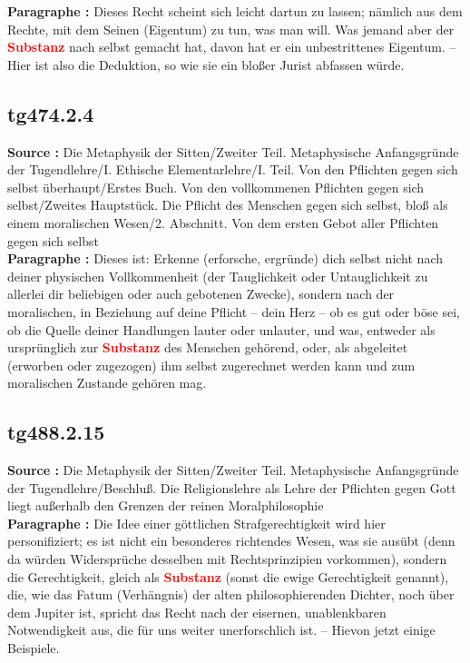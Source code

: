 \documentclass[a4paper,12pt,twoside]{book}
\newcommand{\match}[1]{\textcolor{red}{\textbf{#1}}}
\begin{document}
	\textbf{Paragraphe : }Dieses Recht scheint sich leicht dartun zu lassen; nämlich aus dem Rechte, mit dem Seinen (Eigentum) zu tun, was man will. Was jemand aber der \match{Substanz} nach selbst gemacht hat, davon hat er ein unbestrittenes Eigentum. – Hier ist also die Deduktion, so wie sie ein bloßer Jurist abfassen würde. 
	
	\subsection*{tg474.2.4} 
	\textbf{Source : }Die Metaphysik der Sitten/Zweiter Teil. Metaphysische Anfangsgründe der Tugendlehre/I. Ethische Elementarlehre/I. Teil. Von den Pflichten gegen sich selbst überhaupt/Erstes Buch. Von den vollkommenen Pflichten gegen sich selbst/Zweites Hauptstück. Die Pflicht des Menschen gegen sich selbst, bloß als einem moralischen Wesen/2. Abschnitt. Von dem ersten Gebot aller Pflichten gegen sich selbst\\  
	
	\textbf{Paragraphe : }Dieses ist: Erkenne (erforsche, ergründe) dich selbst nicht nach deiner physischen Vollkommenheit (der Tauglichkeit oder Untauglichkeit zu allerlei dir beliebigen oder auch gebotenen Zwecke), sondern nach der moralischen, in Beziehung auf deine Pflicht – dein Herz – ob es gut oder böse sei, ob die Quelle deiner Handlungen lauter oder unlauter, und was, entweder als ursprünglich zur \match{Substanz} des Menschen gehörend, oder, als abgeleitet (erworben oder zugezogen) ihm selbst zugerechnet werden kann und zum moralischen Zustande gehören mag. 
	
	\subsection*{tg488.2.15} 
	\textbf{Source : }Die Metaphysik der Sitten/Zweiter Teil. Metaphysische Anfangsgründe der Tugendlehre/Beschluß. Die Religionslehre als Lehre der Pflichten gegen Gott liegt außerhalb den Grenzen der reinen Moralphilosophie\\  
	
	\textbf{Paragraphe : }Die Idee einer göttlichen Strafgerechtigkeit wird hier personifiziert; es ist nicht ein besonderes richtendes Wesen, was sie ausübt (denn da würden Widersprüche desselben mit Rechtsprinzipien vorkommen), sondern die Gerechtigkeit, gleich als \match{Substanz} (sonst die ewige Gerechtigkeit genannt), die, wie das Fatum (Verhängnis) der alten philosophierenden Dichter, noch über dem Jupiter ist, spricht das Recht nach der eisernen, unablenkbaren Notwendigkeit aus, die für uns weiter unerforschlich ist. – Hievon jetzt einige Beispiele. 
	
\end{document}
